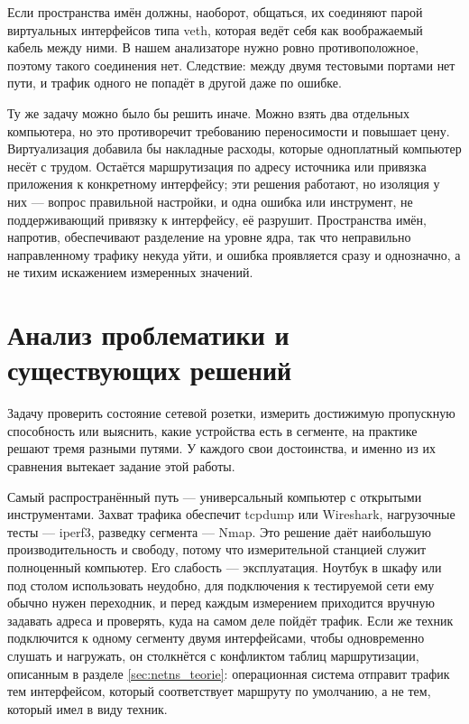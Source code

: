 Если пространства имён должны, наоборот, общаться, их соединяют парой виртуальных интерфейсов типа veth, которая ведёт себя как воображаемый кабель между ними. В нашем анализаторе нужно ровно противоположное, поэтому такого соединения нет. Следствие: между двумя тестовыми портами нет пути, и трафик одного не попадёт в другой даже по ошибке.

Ту же задачу можно было бы решить иначе. Можно взять два отдельных компьютера, но это противоречит требованию переносимости и повышает цену. Виртуализация добавила бы накладные расходы, которые одноплатный компьютер несёт с трудом. Остаётся маршрутизация по адресу источника или привязка приложения к конкретному интерфейсу; эти решения работают, но изоляция у них — вопрос правильной настройки, и одна ошибка или инструмент, не поддерживающий привязку к интерфейсу, её разрушит. Пространства имён, напротив, обеспечивают разделение на уровне ядра, так что неправильно направленному трафику некуда уйти, и ошибка проявляется сразу и однозначно, а не тихим искажением измеренных значений.

\section{Анализ проблематики и существующих решений}
\label{sec:analyza}

Задачу проверить состояние сетевой розетки, измерить достижимую пропускную способность или выяснить, какие устройства есть в сегменте, на практике решают тремя разными путями. У каждого свои достоинства, и именно из их сравнения вытекает задание этой работы.

Самый распространённый путь — универсальный компьютер с открытыми инструментами. Захват трафика обеспечит tcpdump или Wireshark, нагрузочные тесты — iperf3, разведку сегмента — Nmap. Это решение даёт наибольшую производительность и свободу, потому что измерительной станцией служит полноценный компьютер. Его слабость — эксплуатация. Ноутбук в шкафу или под столом использовать неудобно, для подключения к тестируемой сети ему обычно нужен переходник, и перед каждым измерением приходится вручную задавать адреса и проверять, куда на самом деле пойдёт трафик. Если же техник подключится к одному сегменту двумя интерфейсами, чтобы одновременно слушать и нагружать, он столкнётся с конфликтом таблиц маршрутизации, описанным в разделе \ref{sec:netns_teorie}: операционная система отправит трафик тем интерфейсом, который соответствует маршруту по умолчанию, а не тем, который имел в виду техник.

